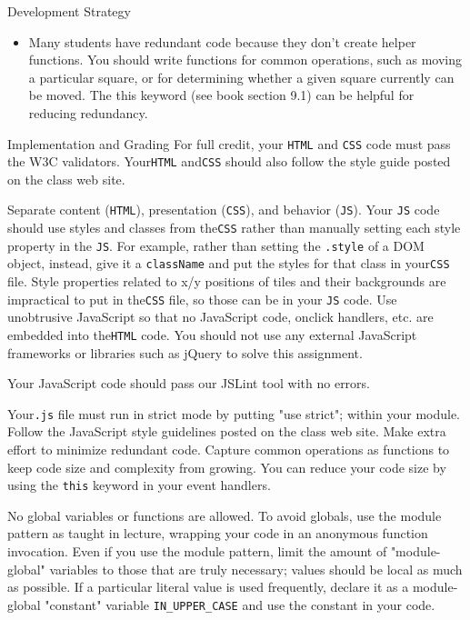 \documentclass[programming]{../../../../mfcs}
\begin{document}
\begin{question}{Development Strategy}
\begin{itemize}
\item Many students have redundant code because they don't create helper functions. You should write functions
for common operations, such as moving a particular square, or for determining whether a given square currently
can be moved. The this keyword (see book section 9.1) can be helpful for reducing redundancy.
\end{itemize}
\end{question}

\begin{question}{Implementation and Grading}
For full credit, your \texttt{HTML} and \texttt{CSS} code must pass the W3C validators. Your\texttt{HTML} and\texttt{CSS} should also follow
the style guide posted on the class web site.
\newline

Separate content (\texttt{HTML}), presentation (\texttt{CSS}), and behavior (\texttt{JS}).
Your \texttt{JS} code should use styles and classes from the\texttt{CSS} rather than manually
setting each style property in the \texttt{JS}. For example, rather than setting the
\texttt{.style} of a
DOM object, instead, give it a \texttt{className} and put the styles for that class in your\texttt{CSS} file. Style properties related
to x/y positions of tiles and their backgrounds are impractical to put in the\texttt{CSS} file, so those can be in your \texttt{JS} code.
Use unobtrusive JavaScript so that no JavaScript code, onclick handlers, etc. are embedded into the\texttt{HTML} code.
You should not use any external JavaScript frameworks or libraries such as jQuery to solve this assignment.
\newline

Your JavaScript code should pass our JSLint tool with no errors.
\newline

Your\texttt{.js} file must run in strict mode by putting "use strict"; within your module.
Follow the JavaScript style guidelines posted on the class web site. Make extra effort to minimize redundant code.
Capture common operations as functions to keep code size and complexity from growing. You can reduce your
      code size by using the \texttt{this} keyword in your event handlers.
\newline

No global variables or functions are allowed. To avoid globals, use the module pattern as taught in lecture,
wrapping your code in an anonymous function invocation. Even if you use the module pattern, limit the amount of
"module-global" variables to those that are truly necessary; values should be local as much as possible. If a particular
      literal value is used frequently, declare it as a module-global "constant" variable
      \texttt{IN\_UPPER\_CASE} and use the
constant in your code.
\newline


\end{question}
\end{document}
